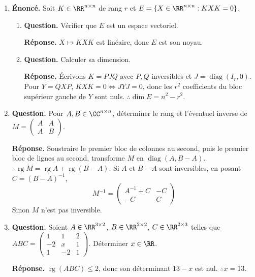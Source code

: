 \documentclass[12pt, a4paper]{article}
\begin{document}
\begin{enumerate}[label=6.\arabic*., start=105]
  \item \begin{minipage}[t]{\linewidth}\raggedright
\textbf{Énoncé.} Soit $K\in\RR^{n\times n}$ de rang $r$ et $E=\{X\in\RR^{n\times n}:KXK=0\}$.

\begin{enumerate}[\arabic*.]
        \item \textbf{Question.} Vérifier que $E$ est un espace vectoriel.
\par\smallskip
\textbf{Réponse.} $X\mapsto KXK$ est linéaire, donc $E$ est son noyau.

  \item \textbf{Question.} Calculer sa dimension.
\par\smallskip
\textbf{Réponse.} Écrivons $K=PJQ$ avec $P,Q$ inversibles et $J=\operatorname{diag}(I_r,0)$.
        Pour $Y=QXP$, $KXK=0\iff JYJ=0$, donc les $r^2$ coefficients du bloc supérieur gauche de $Y$ sont nuls.
        $\therefore\dim E=n^2-r^2$.

\end{enumerate}
\end{minipage}

  \item \begin{minipage}[t]{\linewidth}\raggedright
\textbf{Question.} Pour $A,B\in\CC^{n\times n}$, déterminer le rang et l’éventuel inverse de $M=\begin{pmatrix}A&A\\A&B\end{pmatrix}$.
\par\smallskip
\textbf{Réponse.} Soustraire le premier bloc de colonnes au second, puis le premier bloc de lignes au second, transforme $M$ en $\operatorname{diag}(A,B-A)$.
    $\therefore\operatorname{rg}M=\operatorname{rg}A+\operatorname{rg}(B-A)$.
    Si $A$ et $B-A$ sont inversibles, en posant $C=(B-A)^{-1}$,
    \[
      M^{-1}=\begin{pmatrix}A^{-1}+C&-C\\-C&C\end{pmatrix}
    \]
    Sinon $M$ n'est pas inversible.
\end{minipage}

  \item \begin{minipage}[t]{\linewidth}\raggedright
\textbf{Question.} Soient $A\in\RR^{3\times2}$, $B\in\RR^{2\times2}$, $C\in\RR^{2\times3}$ telles que $ABC=\begin{pmatrix}1&1&2\\-2&x&1\\1&-2&1\end{pmatrix}$. Déterminer $x\in\RR$.
\par\smallskip
\textbf{Réponse.} $\operatorname{rg}(ABC)\leq2$, donc son déterminant $13-x$ est nul.
    $\therefore x=13$.
\end{minipage}


\end{enumerate}
\end{document}
